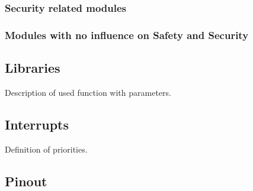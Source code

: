 \subsubsection{Security related modules}

\subsubsection{Modules with no influence on Safety and Security}

\subsection{Libraries}

Description of used function with parameters.


\subsection{Interrupts}

Definition of priorities.

\subsection{Pinout}

